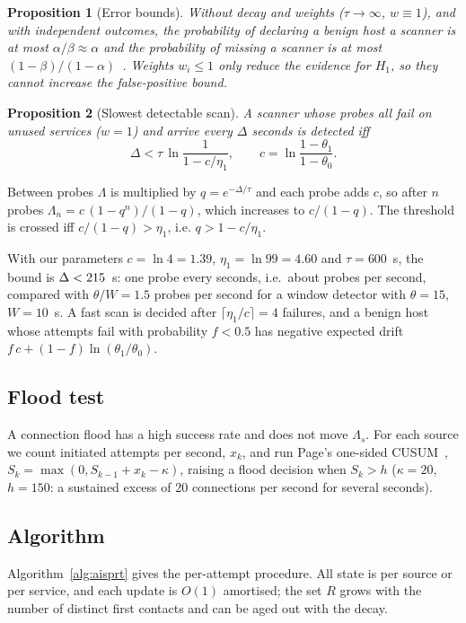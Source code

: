 \documentclass[conference]{IEEEtran}
\newtheorem{proposition}{Proposition}
\begin{document}
\begin{proposition}[Error bounds]\label{prop:bounds}
Without decay and weights ($\tau\to\infty$, $w\equiv1$), and with independent outcomes, the probability of declaring a
benign host a scanner is at most $\alpha/\beta\approx\alpha$ and the probability of missing a scanner is at most
$(1-\beta)/(1-\alpha)$~\cite{wald1945sequential}. Weights $w_i\le1$ only reduce the evidence for $H_1$, so they cannot
increase the false-positive bound.
\end{proposition}

\begin{proposition}[Slowest detectable scan]\label{prop:rate}
A scanner whose probes all fail on unused services ($w=1$) and arrive every $\Delta$ seconds is detected iff
\begin{equation}
\Delta < \tau\,\ln\!\frac{1}{1-c/\eta_1},\qquad c=\ln\frac{1-\theta_1}{1-\theta_0}.
\end{equation}
\end{proposition}
\begin{IEEEproof}
Between probes $\Lambda$ is multiplied by $q=e^{-\Delta/\tau}$ and each probe adds $c$, so after $n$ probes
$\Lambda_n=c\,(1-q^n)/(1-q)$, which increases to $c/(1-q)$. The threshold is crossed iff $c/(1-q)>\eta_1$, i.e.
$q>1-c/\eta_1$.
\end{IEEEproof}
With our parameters $c=\ln4=1.39$, $\eta_1=\ln99=4.60$ and $\tau=600$~s, the bound is $\Delta<215$~s: one probe
every \SlowLimit{} seconds, i.e.\ about \SlowRate{} probes per second, compared with $\theta/W=1.5$ probes per second for a
window detector with $\theta=15$, $W=10$~s. A fast scan is decided after $\lceil\eta_1/c\rceil=4$ failures, and a benign
host whose attempts fail with probability $f<0.5$ has negative expected drift $f\,c+(1-f)\ln(\theta_1/\theta_0)$.

\subsection{Flood test}
A connection flood has a high success rate and does not move $\Lambda_s$. For each source we count initiated attempts
per second, $x_k$, and run Page's one-sided CUSUM~\cite{page1954cusum}, $S_k=\max(0,S_{k-1}+x_k-\kappa)$, raising a flood
decision when $S_k>h$ ($\kappa=20$, $h=150$: a sustained excess of 20 connections per second for several seconds).

\subsection{Algorithm}
Algorithm~\ref{alg:aisprt} gives the per-attempt procedure. All state is per source or per service, and each update is
$O(1)$ amortised; the set $R$ grows with the number of distinct first contacts and can be aged out with the decay.
\end{document}
